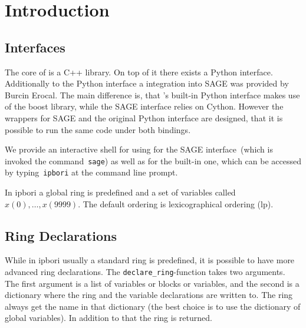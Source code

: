 \section{Introduction}
\subsection{Interfaces}
The core of \PolyBoRi is a C++ library. On top of it there exists a Python interface.
Additionally to the Python interface a integration into SAGE was provided by Burcin Erocal.
The main difference is, that \PolyBoRi's built-in Python interface makes use of
the boost library, while the SAGE interface relies on Cython. 
However the wrappers for SAGE and the original Python interface are designed, that it is possible to run the same code under both bindings.

We provide an interactive shell for \PolyBoRi using \ipython for the SAGE
interface~(which is invoked the command~\texttt{sage}) as well as for the
built-in one, which can be accessed by typing~\texttt{ipbori}
at the command line prompt.


In ipbori a global ring is predefined and a set of variables called  $x(0), \ldots, x(9999)$. The default ordering is lexicographical ordering (lp).

\subsection{Ring Declarations}
While in ipbori usually a standard ring is predefined,
it is possible to have more advanced ring declarations.
The \lstinline|declare_ring|-function takes two arguments.
The first argument is a list of variables or blocks or variables, and the second is a dictionary where the ring and the variable declarations are written to. The ring always get the name  in that dictionary (the best choice is to use the dictionary of global variables). In addition to that the ring is returned.
